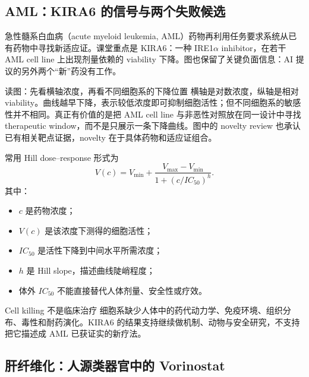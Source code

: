 \subsection{AML：KIRA6 的信号与两个失败候选}

急性髓系白血病（acute myeloid leukemia, AML）药物再利用任务要求系统从已有药物中寻找新适应证。课堂重点是 KIRA6：一种 IRE1$\alpha$ inhibitor，在若干 AML cell line 上出现剂量依赖的 viability 下降。图也保留了关键负面信息：AI 提议的另外两个“新”药没有工作。


\begin{knowledgebox}{读图：先看横轴浓度，再看不同细胞系的下降位置}
横轴是对数浓度，纵轴是相对 viability。曲线越早下降，表示较低浓度即可抑制细胞活性；但不同细胞系的敏感性并不相同。真正有价值的是把 AML cell line 与非恶性对照放在同一设计中寻找 therapeutic window，而不是只展示一条下降曲线。图中的 novelty review 也承认已有相关靶点证据，novelty 在于具体药物和适应证组合。
\end{knowledgebox}

常用 Hill dose--response 形式为
$$
V(c)=V_{\min}+\frac{V_{\max}-V_{\min}}
{1+(c/IC_{50})^{h}}.
$$
其中：
\begin{itemize}
  \item $c$ 是药物浓度；
  \item $V(c)$ 是该浓度下测得的细胞活性；
  \item $IC_{50}$ 是活性下降到中间水平所需浓度；
  \item $h$ 是 Hill slope，描述曲线陡峭程度；
  \item 体外 $IC_{50}$ 不能直接替代人体剂量、安全性或疗效。
\end{itemize}


\begin{warningbox}{Cell killing 不是临床治疗}
细胞系缺少人体中的药代动力学、免疫环境、组织分布、毒性和耐药演化。KIRA6 的结果支持继续做机制、动物与安全研究，不支持把它描述成 AML 已获证实的新疗法。
\end{warningbox}

\subsection{肝纤维化：人源类器官中的 Vorinostat}


